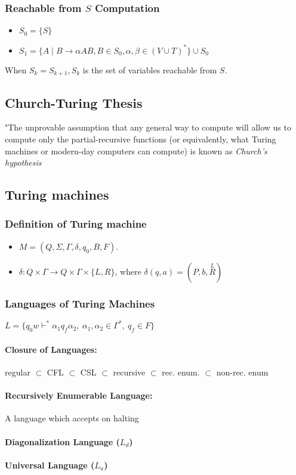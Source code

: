 \documentclass[20pt]{article} %
\begin{document}
\subsubsection{Reachable from $S$ Computation}
\begin{itemize}
\item $S_0 = \{S\}$
\item $S_1 = \{ A \mid B \rightarrow \alpha A B, B \in S_0, \alpha, \beta \in (V \cup T)^{*} \} \cup S_0$
\end{itemize}
When $S_k = S_{k+1}, S_k$ is the set of variables reachable from $S$.
\subsection{Church-Turing Thesis}
"The unprovable assumption that any general way to compute will allow us to compute only the partial-recursive functions (or equivalently, what Turing machines or modern-day computers can compute) is known as \textit{Church's hypothesis}
\subsection{Turing machines}
\subsubsection{Definition of Turing machine}
\begin{itemize}
\item $M = (Q, \Sigma, \Gamma, \delta, q_0, B, F)$.
\item $\delta: Q \times \Gamma \rightarrow Q \times \Gamma \times \{ L, R \}$, where $\delta(q,a) = (P, b, \overset{L}{R})$
\end{itemize}
\subsubsection{Languages of Turing Machines}
$L = \{ q_0 w \vdash^{*} \alpha_1q_f\alpha_2, \ \alpha_1, \alpha_2 \in \Gamma^{*}, \ q_f \in F \}$
\paragraph{Closure of Languages: } regular $\subset$ CFL $\subset$ CSL $\subset$ recursive $\subset$ rec. enum. $\subset$ non-rec. enum
\paragraph{Recursively Enumerable Language:} A language which accepts on halting
\paragraph{Diagonalization Language ($L_d$)}
\paragraph{Universal Language ($L_u$)}
\paragraph{}
\end{document}
